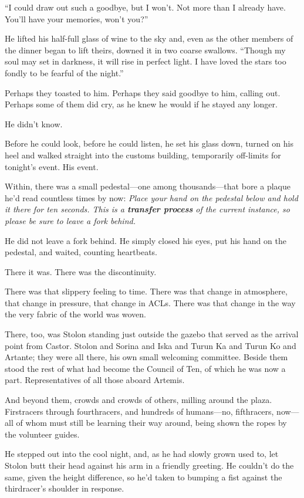 ``I could draw out such a goodbye, but I won't. Not more than I already have. You'll have your memories, won't you?''

He lifted his half-full glass of wine to the sky and, even as the other members of the dinner began to lift theirs, downed it in two coarse swallows. ``Though my soul may set in darkness, it will rise in perfect light. I have loved the stars too fondly to be fearful of the night.''

Perhaps they toasted to him. Perhaps they said goodbye to him, calling out. Perhaps some of them did cry, as he knew he would if he stayed any longer.

He didn't know.

Before he could look, before he could listen, he set his glass down, turned on his heel and walked straight into the customs building, temporarily off-limits for tonight's event. His event.

Within, there was a small pedestal—one among thousands—that bore a plaque he'd read countless times by now: \emph{Place your hand on the pedestal below and hold it there for ten seconds. This is a \textbf{transfer process} of the current instance, so please be sure to leave a fork behind.}

He did not leave a fork behind. He simply closed his eyes, put his hand on the pedestal, and waited, counting heartbeats.

There it was. There was the discontinuity.

There was that slippery feeling to time. There was that change in atmosphere, that change in pressure, that change in ACLs. There was that change in the way the very fabric of the world was woven.

There, too, was Stolon standing just outside the gazebo that served as the arrival point from Castor. Stolon and Sorina and Iska and Turun Ka and Turun Ko and Artante; they were all there, his own small welcoming committee. Beside them stood the rest of what had become the Council of Ten, of which he was now a part. Representatives of all those aboard Artemis.

And beyond them, crowds and crowds of others, milling around the plaza. Firstracers through fourthracers, and hundreds of humans—no, fifthracers, now—all of whom must still be learning their way around, being shown the ropes by the volunteer guides.

He stepped out into the cool night, and, as he had slowly grown used to, let Stolon butt their head against his arm in a friendly greeting. He couldn't do the same, given the height difference, so he'd taken to bumping a fist against the thirdracer's shoulder in response.

